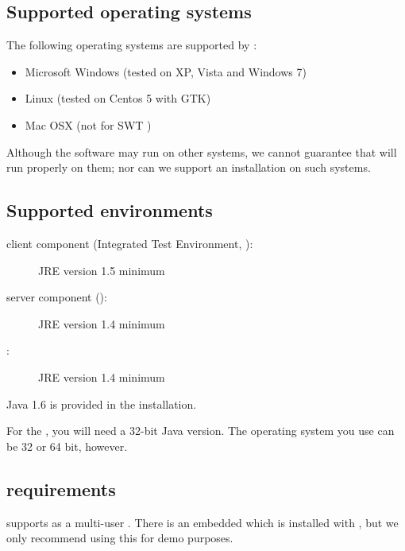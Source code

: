 
\subsection{Supported operating systems}
The following operating systems are supported by \app{}:
\begin{itemize}
  \item Microsoft Windows (tested on XP, Vista and Windows 7)
  \item  Linux (tested on Centos 5 with GTK)
  \item Mac OSX (not for SWT \gdauts{})%

\end{itemize}

Although the software may run on other systems, we cannot guarantee that \app{} will run properly on them; nor can we support an installation on such systems.

\subsection{Supported  environments}
\begin{description}
\item [\app{} client component (Integrated Test Environment, \ite{}):]{JRE version 1.5 minimum}
\item [\app{} server component (\gdagent):]{JRE version 1.4 minimum}
\item [\gdaut{}:]{JRE version 1.4 minimum}
\end{description}
Java 1.6 is provided in the \app{} installation.  

For the \ite{}, you will need a 32-bit Java version. The operating system you use can be 32 or 64 bit, however. 

\subsection{\gdDB requirements}
\app{} supports   as a multi-user \gddb{}. There is an embedded \gddb{} which is installed with \app{}, but we only recommend using this for demo purposes. 

